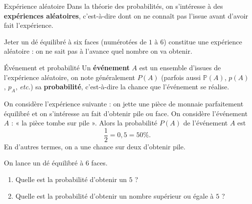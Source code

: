 \documentclass[11pt]{article}
\begin{document}
\begin{defi}{Expérience aléatoire}
  Dans la théorie des probabilités, on s'intéresse à des \textbf{expériences
  aléatoires}, c'est-à-dire dont on ne connaît pas l'issue avant d'avoir fait
  l'expérience.
\end{defi}
\begin{exemple}
  Jeter un dé équilibré à six faces (numérotées de $1$ à $6$) constitue une
  expérience aléatoire : on ne sait pas à l'avance quel nombre on va obtenir.
\end{exemple}
\begin{defi}{Événement et probabilité}
  Un \textbf{événement} $A$ est un ensemble d'issues de l'expérience aléatoire, on note
  généralement $P(A)$ (parfois aussi $\mathbb{P}(A)$, $p(A)$, $p_A$,
  \emph{etc.}) sa \textbf{probabilité}, c'est-à-dire la chance que l'événement
  se réalise.
\end{defi}
\begin{exemple}
  On considère l'expérience suivante : on jette une pièce de monnaie
  parfaitement équilibré et on s'intéresse au fait d'obtenir pile ou face.
  On considère l'événement $A$ : « la pièce tombe sur pile ». Alors la
  probabilité $P(A)$ de l'événement $A$ est
  \[
    \frac{1}{2} = 0,5 = 50\%.
  \]
  En d'autres termes, on a une chance sur deux d'obtenir pile.
\end{exemple}
\begin{app}
  On lance un dé équilibré à $6$ faces.
  \begin{enumerate}
    \item Quelle est la probabilité d'obtenir un $5$ ?
    \item Quelle est la probabilité d'obtenir un nombre supérieur ou égale à $5$
      ?
  \end{enumerate}
\end{app}
\end{document}
